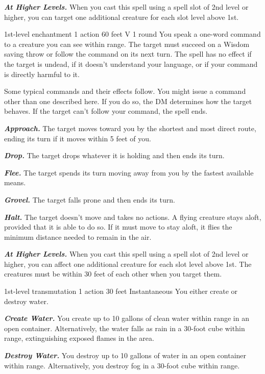 \documentclass[10pt,twoside,twocolumn,openany]{book}
\newcommand\impact[1]{
	\textbf{\textit{#1}}
}
\begin{document}
\impact{At Higher Levels.} When you cast this spell using a spell slot of 2nd level or higher, you can target one additional creature for each slot level above 1st.

{1st-level enchantment}
{\color{action} 1 action}
{60 feet}
{V}
{1 round}
%
You speak a one-word command to a creature you can see within range. The target must succeed on a Wisdom saving throw or follow the command on its next turn. The spell has no effect if the target is undead, if it doesn't understand your language, or if your command is directly harmful to it.

Some typical commands and their effects follow. You might issue a command other than one described here. If you do so, the DM determines how the target behaves. If the target can't follow your command, the spell ends.

\impact{Approach.} The target moves toward you by the shortest and most direct route, ending its turn if it moves within 5 feet of you.

\impact{Drop.} The target drops whatever it is holding and then ends its turn.

\impact{Flee.} The target spends its turn moving away from you by the fastest available means.

\impact{Grovel.} The target falls prone and then ends its turn.

\impact{Halt.} The target doesn't move and takes no actions. A flying creature stays aloft, provided that it is able to do so. If it must move to stay aloft, it flies the minimum distance needed to remain in the air.

\impact{At Higher Levels.} When you cast this spell using a spell slot of 2nd level or higher, you can affect one additional creature for each slot level above 1st. The creatures must be within 30 feet of each other when you target them.

{1st-level transmutation}
{\color{action} 1 action}
{30 feet}
{}
{Instantaneous}
%
You either create or destroy water.

\impact{Create Water.} You create up to 10 gallons of clean
water within range in an open container. Alternatively, the water falls as rain in a 30-foot cube within range, extinguishing exposed flames in the area.

\impact{Destroy Water.} You destroy up to 10 gallons of water in an open container within range. Alternatively, you destroy fog in a 30-foot cube within range.
\end{document}
